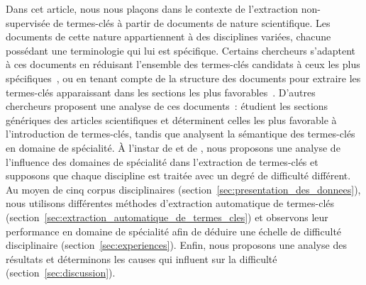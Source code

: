   Dans cet article, nous nous plaçons dans le contexte de l'extraction
  non-supervisée de termes-clés à partir de documents de nature scientifique.
  Les documents de cette nature appartiennent à des disciplines variées, chacune
  possédant une terminologie qui lui est spécifique. Certains chercheurs
  s'adaptent à ces documents en réduisant l'ensemble des termes-clés candidats à
  ceux les plus spécifiques~\cite{kim2009termextraction}, ou en tenant compte de
  la structure des documents pour extraire les termes-clés apparaissant dans les
  sections les plus favorables~\cite{hofmann2009impactofdocumentstructure}.
  D'autres chercheurs proposent une analyse de ces documents~:
   étudient les sections génériques des
  articles scientifiques et déterminent celles les plus favorable à
  l'introduction de termes-clés, tandis que
   analysent la sémantique des
  termes-clés en domaine de spécialité. À l'instar de
   et de
  ,
  nous proposons une analyse de l'influence des domaines de spécialité dans
  l'extraction de termes-clés et supposons que chaque discipline est traitée
  avec un degré de difficulté différent. Au moyen de cinq corpus disciplinaires
  (section~\ref{sec:presentation_des_donnees}), nous utilisons différentes
  méthodes d'extraction automatique de termes-clés
  (section~\ref{sec:extraction_automatique_de_termes_cles}) et observons leur
  performance en domaine de spécialité afin de déduire une échelle de difficulté
  disciplinaire (section~\ref{sec:experiences}). Enfin, nous proposons une
  analyse des résultats et déterminons les causes qui influent sur la difficulté
  (section~\ref{sec:discussion}).

%

